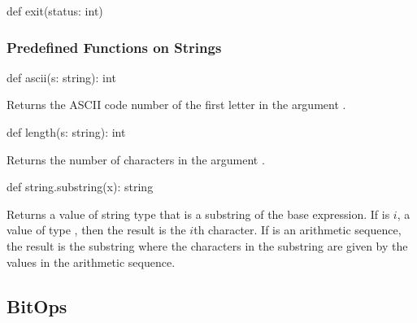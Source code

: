 \begin{protohead}
def halt() {
\end{protohead}
\begin{protobody}
\end{protobody}

\begin{protohead}
def halt(args ...?numArgs) {
\end{protohead}
\begin{protobody}
\end{protobody}

\begin{protohead}
def exit(status: int)
\end{protohead}
\begin{protobody}
\end{protobody}

\subsubsection{Predefined Functions on Strings}
\label{String_Functions}

\begin{protohead}
def ascii(s: string): int
\end{protohead}
\begin{protobody}
Returns the ASCII code number of the first letter in the
argument .
\end{protobody}

\begin{protohead}
def length(s: string): int
\end{protohead}
\begin{protobody}
Returns the number of characters in the argument .
\end{protobody}

\begin{protohead}
def string.substring(x): string
\end{protohead}
\begin{protobody}
Returns a value of string type that is a substring of the base
expression.  If  is $i$, a value of type , then the
result is the $i$th character.  If  is an arithmetic sequence,
the result is the substring where the characters in the substring are
given by the values in the arithmetic sequence.
\end{protobody}

\subsection{BitOps}
\label{BitOps}

